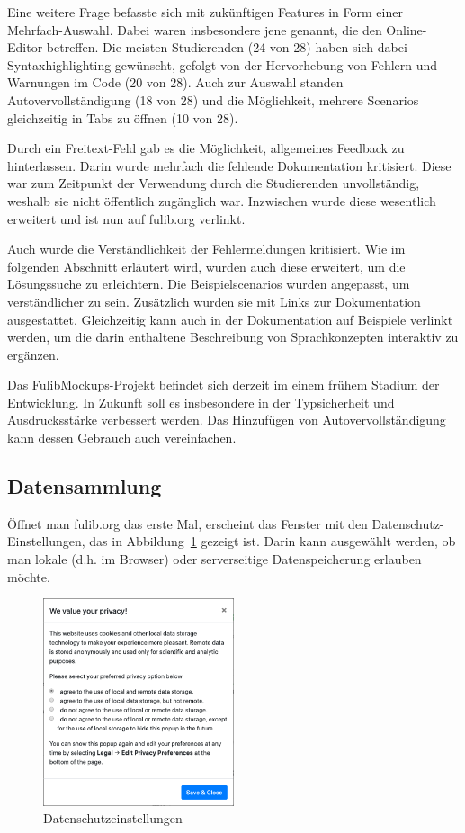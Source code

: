 Eine weitere Frage befasste sich mit zukünftigen Features in Form einer Mehrfach-Auswahl.
Dabei waren insbesondere jene genannt, die den Online-Editor betreffen.
Die meisten Studierenden (24 von 28) haben sich dabei Syntaxhighlighting gewünscht, gefolgt von der Hervorhebung von Fehlern und Warnungen im Code (20 von 28).
Auch zur Auswahl standen Autovervollständigung (18 von 28) und die Möglichkeit, mehrere Scenarios gleichzeitig in Tabs zu öffnen (10 von 28).

Durch ein Freitext-Feld gab es die Möglichkeit, allgemeines Feedback zu hinterlassen.
Darin wurde mehrfach die fehlende Dokumentation kritisiert.
Diese war zum Zeitpunkt der Verwendung durch die Studierenden unvollständig, weshalb sie nicht öffentlich zugänglich war.
Inzwischen wurde diese wesentlich erweitert und ist nun auf fulib.org verlinkt.

Auch wurde die Verständlichkeit der Fehlermeldungen kritisiert.
Wie im folgenden Abschnitt erläutert wird,
wurden auch diese erweitert, um die Lösungssuche zu erleichtern.
Die Beispielscenarios wurden angepasst, um verständlicher zu sein.
Zusätzlich wurden sie mit Links zur Dokumentation ausgestattet.
Gleichzeitig kann auch in der Dokumentation auf Beispiele verlinkt werden,
um die darin enthaltene Beschreibung von Sprachkonzepten interaktiv zu ergänzen.

Das FulibMockups-Projekt befindet sich derzeit im einem frühem Stadium der Entwicklung.
In Zukunft soll es insbesondere in der Typsicherheit und Ausdrucksstärke verbessert werden.
Das Hinzufügen von Autovervollständigung kann dessen Gebrauch auch vereinfachen.

\subsection{Datensammlung}\label{subsec:data-collection}

Öffnet man fulib.org das erste Mal, erscheint das Fenster mit den Datenschutz-Einstellungen, das in Abbildung~\ref{fig:privacy} gezeigt ist.
Darin kann ausgewählt werden, ob man lokale (d.h. im Browser) oder serverseitige Datenspeicherung erlauben möchte.

\begin{figure}
    \centering
    \includegraphics[width=0.5\textwidth]{chapter/fulib.org/img/privacy.png}
    \caption{Datenschutzeinstellungen}
    \label{fig:privacy}
\end{figure}

